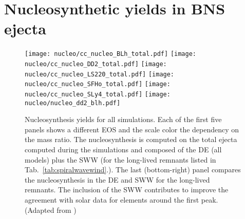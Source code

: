 


\section{Nucleosynthetic yields in \ac{BNS} ejecta}\label{sec:nucleo:results}


\begin{figure*}[h!]
    \centering 
    \texttt{[image: nucleo/cc\_nucleo\_BLh\_total.pdf]}
    \texttt{[image: nucleo/cc\_nucleo\_DD2\_total.pdf]}
    \texttt{[image: nucleo/cc\_nucleo\_LS220\_total.pdf]}
    \texttt{[image: nucleo/cc\_nucleo\_SFHo\_total.pdf]}
    \texttt{[image: nucleo/cc\_nucleo\_SLy4\_total.pdf]}
    \texttt{[image: nucleo/nucleo\_dd2\_blh.pdf]}
    \caption{Nucleosynthesis yields for all simulations. Each %
        of the first five panels 
        shows a different EOS and the scale color the dependency on the
        mass ratio. The nucleosynthesis is computed on the total ejecta
        computed during the simulations and 
        composed of the \ac{DE} (all models) plus the \ac{SWW} 
        (for the long-lived remnants listed in
        Tab.~\ref{tab:spiralwavewind}.).
        The last (bottom-right) panel compares the nucleosynthesis in
        the \ac{DE} and \ac{SWW} for the long-lived
        remnants. The inclusion of the \ac{SWW} contributes to 
        improve the agreement with solar data for elements around the first peak.
        (Adapted from \citet{Nedora:2020pak})
    }
    \label{fig:nucle:totalyields}
\end{figure*}




